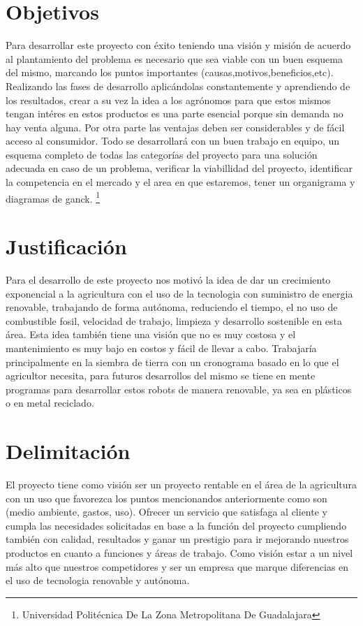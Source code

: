 \documentclass[11pt,a4paper]{article}
\begin{document}
\section{Objetivos}

Para desarrollar este proyecto con éxito teniendo una visión y misión de acuerdo al plantamiento del problema es necesario que sea viable con un buen esquema del mismo, marcando los puntos importantes (causas,motivos,beneficios,etc). Realizando las fases de desarrollo aplicándolas constantemente y aprendiendo de los resultados, crear a su vez la idea a los agrónomos para que estos mismos tengan intéres en estos productos es 
una parte esencial porque sin demanda no hay venta alguna. Por otra parte las ventajas deben ser considerables y de fácil acceso al consumidor.
Todo se desarrollará con un buen trabajo en equipo, un esquema completo de todas las categorías del proyecto para una solución adecuada en caso de un problema, verificar la viabillidad del proyecto, identificar la competencia en el mercado y el area en que estaremos, tener un organigrama y diagramas de ganck.
\footnote{Universidad Politécnica De La Zona Metropolitana De Guadalajara} 
\section{Justificación}
 Para el desarrollo de este proyecto nos motivó la idea de dar un crecimiento exponencial a la agricultura con el uso de la tecnologia con suministro de energia renovable, trabajando de forma autónoma, reduciendo el tiempo, el no uso de combustible fosil, velocidad de trabajo, limpieza y desarrollo sostenible en esta área. Esta idea también tiene una visión que no es muy costosa y el mantenimiento es muy bajo en costos y fácil de llevar a cabo. Trabajaría principalmente en la siembra de tierra con un cronograma basado en lo que el agricultor necesita, para futuros desarrollos del mismo se tiene en mente programas para desarrollar estos robots de manera renovable, ya sea en plásticos o en metal reciclado.
 
 \section{Delimitación}
 El proyecto tiene como visión ser un proyecto rentable en el área de la agricultura con un uso que favorezca los puntos mencionandos anteriormente como son (medio ambiente, gastos, uso). Ofrecer un servicio que satisfaga al cliente y cumpla las necesidades solicitadas en base a la función del proyecto cumpliendo también con calidad, resultados y ganar un prestigio para ir mejorando nuestros productos en cuanto a funciones y áreas de trabajo. Como visión estar a un nivel más alto que nuestros competidores y ser un empresa que marque diferencias en el uso de tecnologia renovable y autónoma.
 
\end{document}
